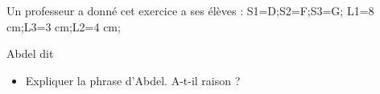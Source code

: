 \documentclass[exercice]{thedocument}%
\begin{document}
%
Un professeur a donné cet exercice a ses élèves :
\>S1=D;\>S2=F;\>S3=G;%
\>L1=8 cm;\>L3=3 cm;\>L2=4 cm;%
\begin{mdframed}
\end{mdframed}
Abdel dit 
\begin{itemize}
    \item Expliquer la phrase d'Abdel. A-t-il raison ?
\end{itemize}
\end{document}
